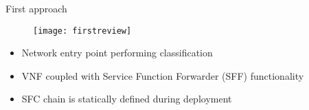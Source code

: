 \begin{frame}{First approach}

  \vspace{-0.5cm}

  \begin{figure}
    \centering
    \texttt{[image: firstreview]}
  \end{figure}

  \vspace{0.2cm}

  \begin{itemize}
    \item Network entry point performing classification
    \item VNF coupled with Service Function Forwarder (SFF) functionality
    \item SFC chain is statically defined during deployment
  \end{itemize}

\end{frame}